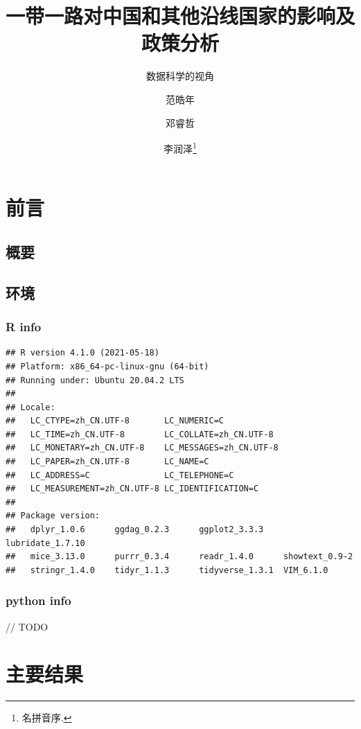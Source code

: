 \documentclass[]{ctexart}
\title{一带一路对中国和其他沿线国家的影响及政策分析}
\subtitle{数据科学的视角}
\author{范皓年 \and 邓睿哲 \and 李润泽\footnote{名拼音序.}}
\date{}
\begin{document}
\maketitle

{
\setcounter{tocdepth}{2}
\tableofcontents
}
\hypertarget{ux524dux8a00}{%
\section{前言}\label{ux524dux8a00}}

\hypertarget{ux6982ux8981}{%
\subsection{概要}\label{ux6982ux8981}}

\hypertarget{ux73afux5883}{%
\subsection{环境}\label{ux73afux5883}}

\hypertarget{r-info}{%
\subsubsection{R info}\label{r-info}}

\begin{verbatim}
## R version 4.1.0 (2021-05-18)
## Platform: x86_64-pc-linux-gnu (64-bit)
## Running under: Ubuntu 20.04.2 LTS
## 
## Locale:
##   LC_CTYPE=zh_CN.UTF-8       LC_NUMERIC=C              
##   LC_TIME=zh_CN.UTF-8        LC_COLLATE=zh_CN.UTF-8    
##   LC_MONETARY=zh_CN.UTF-8    LC_MESSAGES=zh_CN.UTF-8   
##   LC_PAPER=zh_CN.UTF-8       LC_NAME=C                 
##   LC_ADDRESS=C               LC_TELEPHONE=C            
##   LC_MEASUREMENT=zh_CN.UTF-8 LC_IDENTIFICATION=C       
## 
## Package version:
##   dplyr_1.0.6      ggdag_0.2.3      ggplot2_3.3.3    lubridate_1.7.10
##   mice_3.13.0      purrr_0.3.4      readr_1.4.0      showtext_0.9-2  
##   stringr_1.4.0    tidyr_1.1.3      tidyverse_1.3.1  VIM_6.1.0
\end{verbatim}

\hypertarget{python-info}{%
\subsubsection{python info}\label{python-info}}

// TODO

\hypertarget{ux4e3bux8981ux7ed3ux679c}{%
\section{主要结果}\label{ux4e3bux8981ux7ed3ux679c}}
\end{document}
